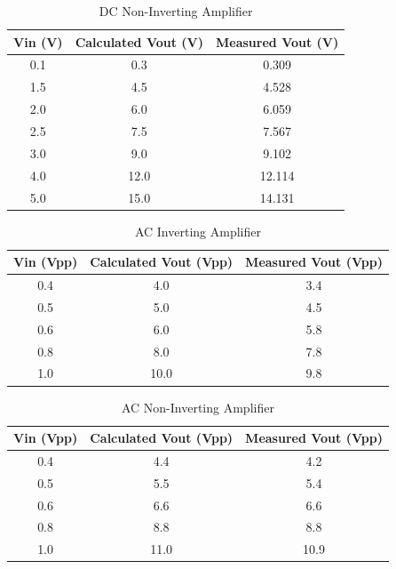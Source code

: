 \documentclass[CMPE]{KGCOEReport}
\begin{document}
\begin{table}[H]
    \centering
    \caption{DC Non-Inverting Amplifier}
    \begin{tabular}{|c|c|c|}
        \hline
        Vin (V) & Calculated Vout (V) & Measured Vout (V) \\
        \hline
        0.1 & 0.3 & 0.309 \\
        \hline
        1.5 & 4.5 & 4.528 \\
        \hline
        2.0 & 6.0 & 6.059 \\
        \hline
        2.5 & 7.5 & 7.567 \\
        \hline
        3.0 & 9.0 & 9.102 \\
        \hline
        4.0 & 12.0 & 12.114 \\
        \hline
        5.0 & 15.0 & 14.131 \\
        \hline
    \end{tabular}
\end{table}

\begin{table}[H]
    \centering
    \caption{AC Inverting Amplifier}
    \begin{tabular}{|c|c|c|}
        \hline
        Vin (Vpp) & Calculated Vout (Vpp) & Measured Vout (Vpp) \\
        \hline
        0.4 & 4.0 & 3.4 \\
        \hline
        0.5 & 5.0 & 4.5 \\
        \hline
        0.6 & 6.0 & 5.8 \\
        \hline
        0.8 & 8.0 & 7.8 \\
        \hline
        1.0 & 10.0 & 9.8 \\
        \hline
    \end{tabular}
\end{table}

\begin{table}[H]
    \centering
    \caption{AC Non-Inverting Amplifier}
    \begin{tabular}{|c|c|c|}
        \hline
        Vin (Vpp) & Calculated Vout (Vpp) & Measured Vout (Vpp) \\
        \hline
        0.4 & 4.4 & 4.2 \\
        \hline
        0.5 & 5.5 & 5.4 \\
        \hline
        0.6 & 6.6 & 6.6 \\
        \hline
        0.8 & 8.8 & 8.8 \\
        \hline
        1.0 & 11.0 & 10.9 \\
        \hline
    \end{tabular}
\end{table}
\end{document}
